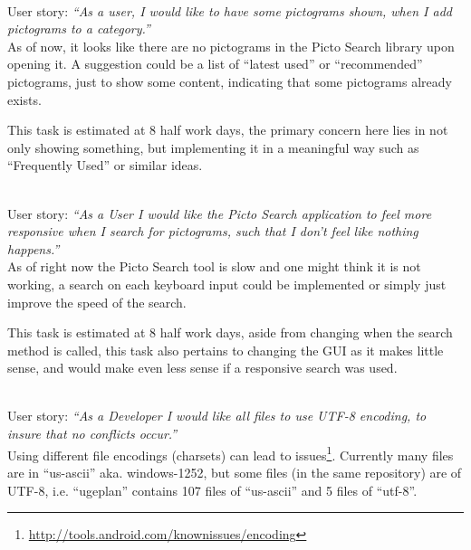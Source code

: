 \begin{description}[style=unboxed]
    \item[Picto Search - It looks like there are no pictograms, until you search for them] \hfill \\ 
        User story: \textit{``As a user, I would like to have some pictograms shown, when I add pictograms to a category.''}\\
        As of now, it looks like there are no pictograms in the Picto Search library upon opening it. 
        A suggestion could be a list of ``latest used'' or ``recommended'' pictograms, just to show some content, indicating that some pictograms already exists.

        This task is estimated at 8 half work days, the primary concern here lies in not only showing something, but implementing it in a meaningful way such as ``Frequently Used'' or similar ideas.
    \item[Picto Search - Responsive Search] \hfill \\
        User story: \textit{``As a User I would like the Picto Search application to feel more responsive when I search for pictograms, such that I don't feel like nothing happens.''} \\ 
        As of right now the Picto Search tool is slow and one might think it is not working, a search on each keyboard input could be implemented or simply just improve the speed of the search.

        This task is estimated at 8 half work days, aside from changing when the search method is called, this task also pertains to changing the GUI as it makes little sense, and would make even less sense if a responsive search was used. 
    \item[General - Use consistent file encoding] \hfill \\
        User story: \textit{``As a Developer I would like all files to use UTF-8 encoding, to insure that no conflicts occur.''} \\
        Using different file encodings (charsets) can lead to issues\footnote{\url{http://tools.android.com/knownissues/encoding}}. 
        Currently many files are in ``us-ascii'' aka. windows-1252, but some files (in the same repository) are of UTF-8, i.e. ``ugeplan'' contains 107 files of ``us-ascii'' and 5 files of ``utf-8''.    


\end{description}

